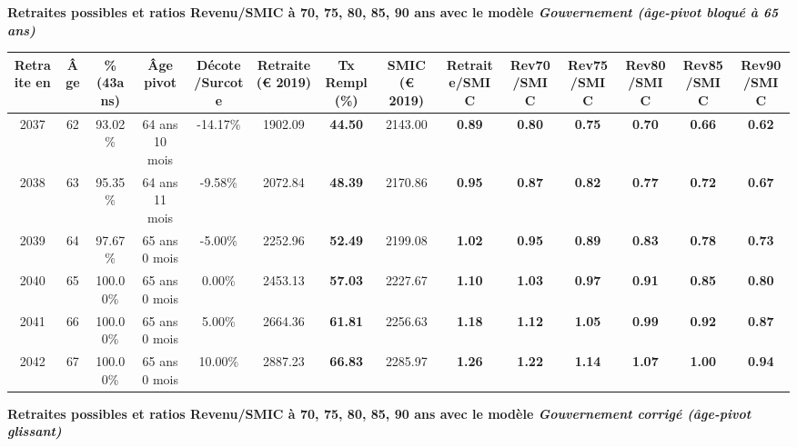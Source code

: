 {\bf \noindent Retraites possibles et ratios Revenu/SMIC à 70, 75, 80, 85, 90 ans avec le modèle \emph{Gouvernement (âge-pivot bloqué à 65 ans)}}  
 
\begin{adjustbox}{max width=\textwidth} 
\begin{tabular}[htb]{|c|c||c|c|c||c|c||c||c|c|c|c|c|c|} 
\hline 
 Retraite en &  Âge &  \%(43ans) &  Âge pivot &  Décote/Surcote &  Retraite (\euro{} 2019) &  Tx Rempl(\%) &  SMIC (\euro{} 2019) &  Retraite/SMIC &  Rev70/SMIC &  Rev75/SMIC &  Rev80/SMIC &  Rev85/SMIC &  Rev90/SMIC \\ 
\hline \hline 
 2037 &  62 &  93.02\% &  64 ans 10 mois &  -14.17\% &  1902.09 &  {\bf 44.50} &  2143.00 &  {\bf {\color{red} 0.89}} &  {\bf {\color{red} 0.80}} &  {\bf {\color{red} 0.75}} &  {\bf {\color{red} 0.70}} &  {\bf {\color{red} 0.66}} &  {\bf {\color{red} 0.62}} \\ 
\hline 
 2038 &  63 &  95.35\% &  64 ans 11 mois &  -9.58\% &  2072.84 &  {\bf 48.39} &  2170.86 &  {\bf {\color{red} 0.95}} &  {\bf {\color{red} 0.87}} &  {\bf {\color{red} 0.82}} &  {\bf {\color{red} 0.77}} &  {\bf {\color{red} 0.72}} &  {\bf {\color{red} 0.67}} \\ 
\hline 
 2039 &  64 &  97.67\% &  65 ans 0 mois &  -5.00\% &  2252.96 &  {\bf 52.49} &  2199.08 &  {\bf 1.02} &  {\bf {\color{red} 0.95}} &  {\bf {\color{red} 0.89}} &  {\bf {\color{red} 0.83}} &  {\bf {\color{red} 0.78}} &  {\bf {\color{red} 0.73}} \\ 
\hline 
 2040 &  65 &  100.00\% &  65 ans 0 mois &  0.00\% &  2453.13 &  {\bf 57.03} &  2227.67 &  {\bf 1.10} &  {\bf 1.03} &  {\bf {\color{red} 0.97}} &  {\bf {\color{red} 0.91}} &  {\bf {\color{red} 0.85}} &  {\bf {\color{red} 0.80}} \\ 
\hline 
 2041 &  66 &  100.00\% &  65 ans 0 mois &  5.00\% &  2664.36 &  {\bf 61.81} &  2256.63 &  {\bf 1.18} &  {\bf 1.12} &  {\bf 1.05} &  {\bf {\color{red} 0.99}} &  {\bf {\color{red} 0.92}} &  {\bf {\color{red} 0.87}} \\ 
\hline 
 2042 &  67 &  100.00\% &  65 ans 0 mois &  10.00\% &  2887.23 &  {\bf 66.83} &  2285.97 &  {\bf 1.26} &  {\bf 1.22} &  {\bf 1.14} &  {\bf 1.07} &  {\bf 1.00} &  {\bf {\color{red} 0.94}} \\ 
\hline 
\hline 
\end{tabular} 
\end{adjustbox} 
 
 \vspace{0.1cm} 
{\bf \noindent Retraites possibles et ratios Revenu/SMIC à 70, 75, 80, 85, 90 ans avec le modèle \emph{Gouvernement corrigé (âge-pivot glissant)}}  
 
